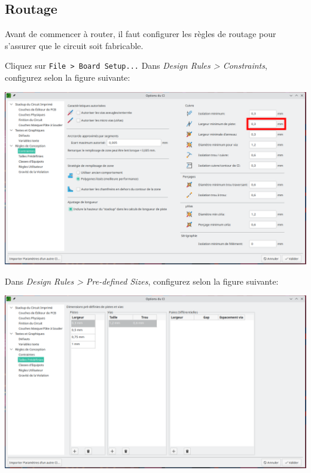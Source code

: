 \documentclass[12pt,%
addpoints,%
]{exam}
\begin{document}
\subsection{Routage}
Avant de commencer à router, il faut configurer les règles de routage pour s'assurer que le circuit soit fabricable.
\begin{questions}
	\question Cliquez sur \texttt{File > Board Setup...}
	\question Dans \emph{Design Rules > Constraints}, configurez selon la figure suivante:
	\begin{center}
        \includegraphics[width=\linewidth]{figures/kicad25.png}
    \end{center}

	\newpage

	\question Dans \emph{Design Rules > Pre-defined Sizes}, configurez selon la figure suivante:
	\begin{center}
        \includegraphics[width=\linewidth]{figures/kicad26.png}
    \end{center}


\end{questions}
\end{document}
